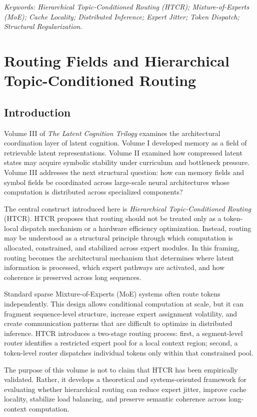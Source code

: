 \noindent \textit{Keywords: Hierarchical Topic-Conditioned Routing (HTCR); Mixture-of-Experts (MoE); Cache Locality; Distributed Inference; Expert Jitter; Token Dispatch; Structural Regularization.}

\chapter{Routing Fields and Hierarchical Topic-Conditioned Routing}

\section{Introduction}

Volume III of \textit{The Latent Cognition Trilogy} examines the architectural coordination layer of latent cognition. Volume I developed memory as a field of retrievable latent representations. Volume II examined how compressed latent states may acquire symbolic stability under curriculum and bottleneck pressure. Volume III addresses the next structural question: how can memory fields and symbol fields be coordinated across large-scale neural architectures whose computation is distributed across specialized components?

The central construct introduced here is \textit{Hierarchical Topic-Conditioned Routing} (HTCR). HTCR proposes that routing should not be treated only as a token-local dispatch mechanism or a hardware efficiency optimization. Instead, routing may be understood as a structural principle through which computation is allocated, constrained, and stabilized across expert modules. In this framing, routing becomes the architectural mechanism that determines where latent information is processed, which expert pathways are activated, and how coherence is preserved across long sequences.

Standard sparse Mixture-of-Experts (MoE) systems often route tokens independently. This design allows conditional computation at scale, but it can fragment sequence-level structure, increase expert assignment volatility, and create communication patterns that are difficult to optimize in distributed inference. HTCR introduces a two-stage routing process: first, a segment-level router identifies a restricted expert pool for a local context region; second, a token-level router dispatches individual tokens only within that constrained pool.

The purpose of this volume is not to claim that HTCR has been empirically validated. Rather, it develops a theoretical and systems-oriented framework for evaluating whether hierarchical routing can reduce expert jitter, improve cache locality, stabilize load balancing, and preserve semantic coherence across long-context computation.

